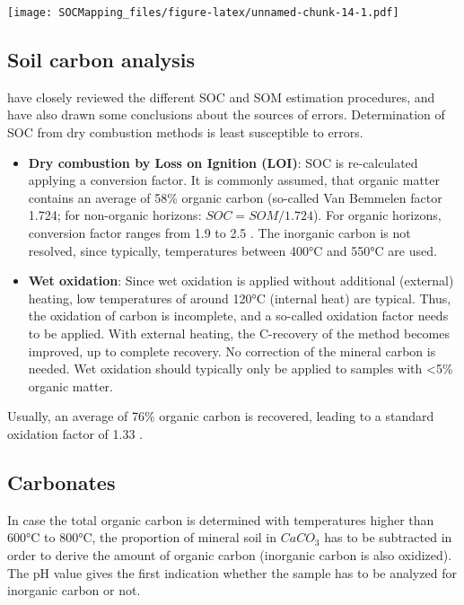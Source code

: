 \documentclass[10pt,b5paper,]{book}
\theoremstyle{definition}
\theoremstyle{definition}
\theoremstyle{definition}
\theoremstyle{remark}
\begin{document}
\texttt{[image: SOCMapping\_files/figure-latex/unnamed-chunk-14-1.pdf]}

\hypertarget{soil-carbon-analysis}{%
\subsection{Soil carbon analysis}\label{soil-carbon-analysis}}

\cite{rosell2001soil} have closely reviewed the different SOC and SOM
estimation procedures, and have also drawn some conclusions about the
sources of errors. Determination of SOC from dry combustion methods is
least susceptible to errors.

\begin{itemize}
\item
  \textbf{Dry combustion by Loss on Ignition (LOI)}: SOC is
  re-calculated applying a conversion factor. It is commonly assumed,
  that organic matter contains an average of 58\% organic carbon
  (so-called Van Bemmelen factor 1.724; for non-organic horizons:
  \(SOC = SOM / 1.724\)). For organic horizons, conversion factor ranges
  from 1.9 to 2.5 \citep{nelson1982total}. The inorganic carbon is not
  resolved, since typically, temperatures between 400°C and 550°C are
  used.
\item
  \textbf{Wet oxidation}: Since wet oxidation is applied without
  additional (external) heating, low temperatures of around 120°C
  (internal heat) are typical. Thus, the oxidation of carbon is
  incomplete, and a so-called oxidation factor needs to be applied. With
  external heating, the C-recovery of the method becomes improved, up to
  complete recovery. No correction of the mineral carbon is needed. Wet
  oxidation should typically only be applied to samples with
  \textless{}5\% organic matter.
\end{itemize}

Usually, an average of 76\% organic carbon is recovered, leading to a
standard oxidation factor of 1.33 \citep{lettens2005soil}.

\hypertarget{carbonates}{%
\subsection{Carbonates}\label{carbonates}}

In case the total organic carbon is determined with temperatures higher
than 600°C to 800°C, the proportion of mineral soil in \(CaCO_3\) has to
be subtracted in order to derive the amount of organic carbon (inorganic
carbon is also oxidized). The pH value gives the first indication
whether the sample has to be analyzed for inorganic carbon or not.
\end{document}
